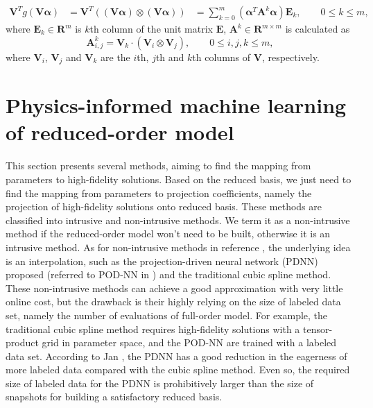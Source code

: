\documentclass[preprint, 10pt]{elsarticle}
\begin{document}
\begin{equation}
\begin{aligned}
\mathbf{V}^T
g \left( \mathbf{V} \pmb{\alpha} \right)
&=
\mathbf{V}^T
\left(
\left( \mathbf{V} \pmb{\alpha} \right) \otimes \left( \mathbf{V} \pmb{\alpha} \right)
\right)
&= \sum_{k=0}^{m} { \left( \pmb{\alpha}^T \mathbf{A}^k \pmb{\alpha} \right) \mathbf{E}_k }, \qquad 0 \le k \le m,
\end{aligned}
\label{eq_ReductionNonlinear}
\end{equation}
where $\mathbf{E}_k \in \mathbf{R}^{m}$ is $k$th column of the unit matrix $\mathbf{E}$, $\mathbf{A}^k \in \mathbf{R}^{m \times m}$ is calculated as
\begin{equation}
\mathbf{A}_{i,j}^k = \mathbf{V}_k \cdot \left( \mathbf{V}_i \otimes \mathbf{V}_j \right), \qquad 0 \le i,j,k \le m,
\end{equation}
where $\mathbf{V}_i$, $\mathbf{V}_j$ and $\mathbf{V}_k$ are the $i$th, $j$th and $k$th columns of $\mathbf{V}$, respectively.

\section{Physics-informed machine learning of reduced-order model}
This section presents several methods, aiming to find the mapping from parameters to high-fidelity solutions. Based on the reduced basis, we just need to find the mapping from parameters to projection coefficients, namely the projection of high-fidelity solutions onto reduced basis.
These methods are classified into intrusive and non-intrusive methods. We term it as a non-intrusive method if the reduced-order model won't need to be built, otherwise it is an intrusive method.
As for non-intrusive methods in reference \cite{hesthaven2018non}, the underlying idea is an interpolation, such as the projection-driven neural network (PDNN) proposed (referred to POD-NN in \cite{hesthaven2018non}) and the traditional cubic spline method. These non-intrusive methods can achieve a good approximation with very little online cost, but the drawback is their highly relying on the size of labeled data set, namely the number of evaluations of full-order model.
For example, the traditional cubic spline method requires high-fidelity solutions with a tensor-product grid in parameter space, and the POD-NN are trained with a labeled data set.
According to Jan \cite{hesthaven2018non}, the PDNN has a good reduction in the eagerness of more labeled data compared with the cubic spline method.
Even so, the required size of labeled data for the PDNN is prohibitively larger than the size of snapshots for building a satisfactory reduced basis.
\end{document}
